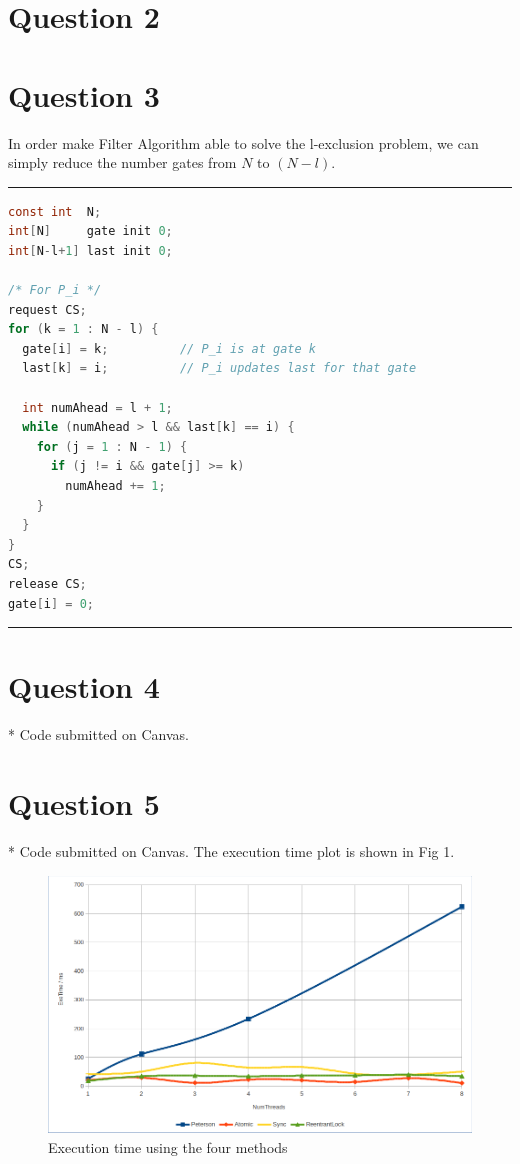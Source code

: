 \documentclass[12pt]{article}
\begin{document}
\section*{Question 2}

\section*{Question 3} 
In order make Filter Algorithm able to solve the l-exclusion problem, we can simply reduce the number gates from $N$ to $(N - l)$. \\
\noindent\rule[0.5ex]{\linewidth}{1pt}
\begin{lstlisting}[language=C] 
const int  N;           
int[N]     gate init 0; 
int[N-l+1] last init 0; 

/* For P_i */ 
request CS; 
for (k = 1 : N - l) { 
  gate[i] = k;          // P_i is at gate k 
  last[k] = i;          // P_i updates last for that gate 
	
  int numAhead = l + 1;   
  while (numAhead > l && last[k] == i) {
    for (j = 1 : N - 1) {
	  if (j != i && gate[j] >= k) 
	    numAhead += 1; 
    }
  }
}
CS; 
release CS; 
gate[i] = 0; 
\end{lstlisting}
\noindent\rule[0.5ex]{\linewidth}{1pt}

\section*{Question 4} 
* Code submitted on Canvas. 

\section*{Question 5}  
* Code submitted on Canvas. The execution time plot is shown in Fig 1. 
\begin{figure} 
	 \includegraphics[width=\linewidth]{plot.png}
	 \caption{Execution time using the four methods}
\end{figure} 
\end{document}
